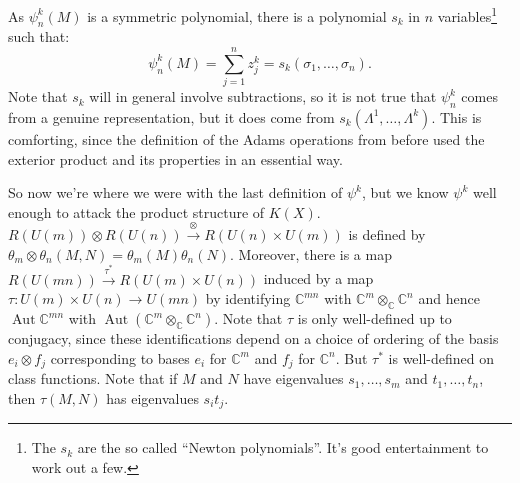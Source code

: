 \documentclass{article}
\newcommand{\C}{\mathbb{C}}
\DeclareMathOperator{\Aut}{Aut}
\renewcommand{\to}{\longrightarrow}
\theoremstyle{definition}
\begin{document}
As $\psi^k_n(M)$ is a symmetric polynomial, there is a polynomial $s_k$ in $n$ variables\footnote{The $s_k$ are the so called ``Newton polynomials''. It's good entertainment to work out a few.} such that:
\[\psi^k_n(M)=\sum_{j=1}^n z_j^k=s_k(\sigma_1,\ldots,\sigma_n).\]
Note that $s_k$ will in general involve subtractions, so it is not true that $\psi^k_n$ comes from a genuine representation, but it does come from $s_k(\Lambda^1, \ldots, \Lambda^k)$.  This is comforting, since the definition of the Adams operations from before used the exterior product and its properties in an essential way.

So now we're where we were with the last definition of $\psi^k$, but we know $\psi^k$ well enough to attack the product structure of $K(X)$.  $R(U(m)) \otimes R(U(n)) \stackrel{\otimes}{\to} R(U(n) \times U(m))$ is defined by $\theta_m \otimes \theta_n(M, N) = \theta_m(M) \theta_n(N)$.  Moreover, there is a map $R(U(mn)) \stackrel{\tau^*}{\to} R(U(m) \times U(n))$ induced by a map $\tau: U(m) \times U(n) \to U(mn)$ by identifying $\C^{mn}$ with $\C^m \otimes_\C \C^n$ and hence $\Aut \C^{mn}$ with $\Aut (\C^m \otimes_\C \C^n)$.  Note that $\tau$ is only well-defined up to conjugacy, since these identifications depend on a choice of ordering of the basis $e_i \otimes f_j$ corresponding to bases $e_i$ for $\C^m$ and $f_j$ for $\C^n$.  But $\tau^*$ is well-defined on class functions.  Note that if $M$ and $N$ have eigenvalues $s_1, \ldots, s_m$ and $t_1, \ldots, t_n$, then $\tau(M, N)$ has eigenvalues $s_i t_j$.
\end{document}

